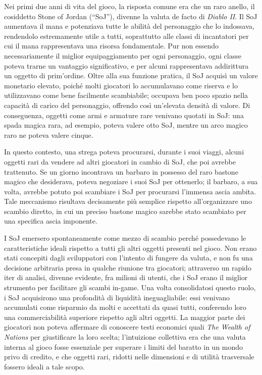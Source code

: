 \documentclass[
  a5paper,
  smalldemyvopaper,10pt,twoside,onecolumn,openright,extrafontsizes,hidelinks]{memoir}
\begin{document}
Nei primi due anni di vita del gioco, la risposta comune era che un raro
anello, il cosiddetto Stone of Jordan (``SoJ''), divenne la valuta de
facto di \emph{Diablo II}. Il SoJ aumentava il mana e potenziava tutte
le abilità del personaggio che lo indossava, rendendolo estremamente
utile a tutti, soprattutto alle classi di incantatori per cui il mana
rappresentava una risorsa fondamentale. Pur non essendo necessariamente
il miglior equipaggiamento per ogni personaggio, ogni classe poteva
trarne un vantaggio significativo, e per alcuni rappresentava
addirittura un oggetto di prim'ordine. Oltre alla sua funzione pratica,
il SoJ acquisì un valore monetario elevato, poiché molti giocatori lo
accumulavano come riserva e lo utilizzavano come bene facilmente
scambiabile; occupava ben poco spazio nella capacità di carico del
personaggio, offrendo così un'elevata densità di valore. Di conseguenza,
oggetti come armi e armature rare venivano quotati in SoJ: una spada
magica rara, ad esempio, poteva valere otto SoJ, mentre un arco magico
raro ne poteva valere cinque.

In questo contesto, una strega poteva procurarsi, durante i suoi viaggi,
alcuni oggetti rari da vendere ad altri giocatori in cambio di SoJ, che
poi avrebbe trattenuto. Se un giorno incontrava un barbaro in possesso
del raro bastone magico che desiderava, poteva negoziare i suoi SoJ per
ottenerlo; il barbaro, a sua volta, avrebbe potuto poi scambiare i SoJ
per procurarsi l'immensa ascia ambita. Tale meccanismo risultava
decisamente più semplice rispetto all'organizzare uno scambio diretto,
in cui un preciso bastone magico sarebbe stato scambiato per una
specifica ascia imponente.

I SoJ emersero spontaneamente come mezzo di scambio perché possedevano
le caratteristiche ideali rispetto a tutti gli altri oggetti presenti
nel gioco. Non erano stati concepiti dagli sviluppatori con l'intento di
fungere da valuta, e non fu una decisione arbitraria presa in qualche
riunione tra giocatori; attraverso un rapido iter di analisi, divenne
evidente, fra milioni di utenti, che i SoJ erano il miglior strumento
per facilitare gli scambi in-game. Una volta consolidatosi questo ruolo,
i SoJ acquisirono una profondità di liquidità ineguagliabile: essi
venivano accumulati come risparmio da molti e accettati da quasi tutti,
conferendo loro una commerciabilità superiore rispetto agli altri
oggetti. La maggior parte dei giocatori non poteva affermare di
conoscere testi economici quali \emph{The Wealth of Nations} per
giustificare la loro scelta; l'intuizione collettiva era che una valuta
interna al gioco fosse essenziale per superare i limiti del baratto in
un mondo privo di credito, e che oggetti rari, ridotti nelle dimensioni
e di utilità trasversale fossero ideali a tale scopo.
\end{document}

